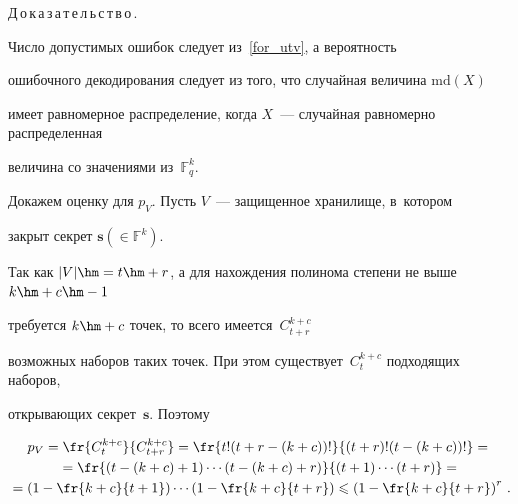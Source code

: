 




\noindent


Д\,о\,к\,а\,з\,а\,т\,е\,л\,ь\,с\,т\,в\,о\,.\ \


Число допустимых ошибок следует из~\eqref{for_utv}, а вероятность 


ошибочного декодирования следует из того, что случайная величина $\mathrm{md}(X)$ 


имеет равномерное распределение, когда $X$~--- случайная равномерно распределенная 


величина со значениями из~$\mathbb{F}^{k}_q$.





 Докажем оценку для $p_{V}$. Пусть $V$~--- защищенное хранилище, в~котором 


 закрыт секрет $\mathbf{s}(\in \mathbb{F}^{k})$. 


 Так как $|V|\hm=t\hm+r$, а для нахождения полинома степени не выше $k\hm+c\hm-1$ 


 требуется $k\hm+c$ точек, то всего имеется~$C^{k+c}_{t+r}$ 


 возможных наборов таких точек. При этом существует~$C^{k+c}_{t}$ подходящих наборов, 


 открывающих секрет~$\mathbf{s}$. Поэтому


\begin{multline*}


p_V=\fr{C^{k+c}_{t}}{C^{k+c}_{t+r}}=\fr{t!(t+r-(k+c))!}{(t+r)!(t-(k+c))!}={}\\


{}=\fr{(t-(k+c)+1)\cdots(t-(k+c)+r)}{(t+1)\cdots(t+r)}={}\\


{}={\left(1-\fr{k+c}{t+1}\right)\cdots \left(1-\fr{k+c}{t+r}\right)}\leqslant 


\left(1-\fr{k+c}{t+r}\right)^{r}\,.


\end{multline*}





